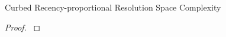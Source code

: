 \begin{theorem}{Curbed Recency-proportional Resolution Space Complexity}
\label{thm:curbed-recency-proportional-resolution-algo-space-complexity}

\end{theorem}

\begin{proof}
\label{prf:curbed-recency-proportional-resolution-algo-space-complexity}

\end{proof}
